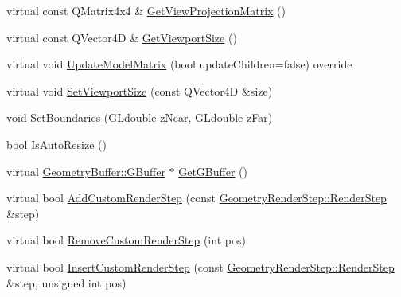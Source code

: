 \begin{DoxyCompactItemize}
virtual const Q\+Matrix4x4 \& \mbox{\hyperlink{class_geometry_engine_1_1_geometry_world_item_1_1_geometry_camera_1_1_camera_a0d7981b39154b1b781af8721539659ac}{Get\+View\+Projection\+Matrix}} ()
\item 
virtual const Q\+Vector4D \& \mbox{\hyperlink{class_geometry_engine_1_1_geometry_world_item_1_1_geometry_camera_1_1_camera_a350c2e6563b78871f43fc0100cb8d1a9}{Get\+Viewport\+Size}} ()
\item 
virtual void \mbox{\hyperlink{class_geometry_engine_1_1_geometry_world_item_1_1_geometry_camera_1_1_camera_afe7145a1edb13ce3a50c2964f5c865e9}{Update\+Model\+Matrix}} (bool update\+Children=false) override
\item 
virtual void \mbox{\hyperlink{class_geometry_engine_1_1_geometry_world_item_1_1_geometry_camera_1_1_camera_aabac97d1334ff271308102e53735d042}{Set\+Viewport\+Size}} (const Q\+Vector4D \&size)
\item 
void \mbox{\hyperlink{class_geometry_engine_1_1_geometry_world_item_1_1_geometry_camera_1_1_camera_acf991463c9975a3b0dd047bb73a7dc95}{Set\+Boundaries}} (G\+Ldouble z\+Near, G\+Ldouble z\+Far)
\item 
bool \mbox{\hyperlink{class_geometry_engine_1_1_geometry_world_item_1_1_geometry_camera_1_1_camera_a48e1e7bfc2aea19d21ecf5a311815740}{Is\+Auto\+Resize}} ()
\item 
virtual \mbox{\hyperlink{class_geometry_engine_1_1_geometry_buffer_1_1_g_buffer}{Geometry\+Buffer\+::\+G\+Buffer}} $\ast$ \mbox{\hyperlink{class_geometry_engine_1_1_geometry_world_item_1_1_geometry_camera_1_1_camera_a3199beae18911ea2ab5c438819d09971}{Get\+G\+Buffer}} ()
\item 
virtual bool \mbox{\hyperlink{class_geometry_engine_1_1_geometry_world_item_1_1_geometry_camera_1_1_camera_a548c5c566cc732b7d0c00aca94cdcbbe}{Add\+Custom\+Render\+Step}} (const \mbox{\hyperlink{class_geometry_engine_1_1_geometry_render_step_1_1_render_step}{Geometry\+Render\+Step\+::\+Render\+Step}} \&step)
\item 
virtual bool \mbox{\hyperlink{class_geometry_engine_1_1_geometry_world_item_1_1_geometry_camera_1_1_camera_adb12d29b67837c4d5e5c94f6cb956bbd}{Remove\+Custom\+Render\+Step}} (int pos)
\item 
virtual bool \mbox{\hyperlink{class_geometry_engine_1_1_geometry_world_item_1_1_geometry_camera_1_1_camera_aff83b52805cc8085af8f0802ab554c11}{Insert\+Custom\+Render\+Step}} (const \mbox{\hyperlink{class_geometry_engine_1_1_geometry_render_step_1_1_render_step}{Geometry\+Render\+Step\+::\+Render\+Step}} \&step, unsigned int pos)

\end{DoxyCompactItemize}
